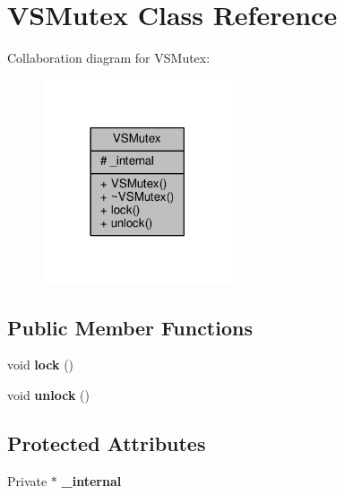 \hypertarget{classVSMutex}{}\section{V\+S\+Mutex Class Reference}
\label{classVSMutex}


Collaboration diagram for V\+S\+Mutex\+:
\nopagebreak
\begin{figure}[H]
\begin{center}
\leavevmode
\includegraphics[width=158pt]{d0/d17/classVSMutex__coll__graph}
\end{center}
\end{figure}
\subsection*{Public Member Functions}
\begin{DoxyCompactItemize}
\item 
void {\bfseries lock} ()\hypertarget{classVSMutex_ab49520c89fcdb8cbf1d3662255e1a16d}{}\label{classVSMutex_ab49520c89fcdb8cbf1d3662255e1a16d}

\item 
void {\bfseries unlock} ()\hypertarget{classVSMutex_a4f18e37e226ef797f6d9c47c1cc690f5}{}\label{classVSMutex_a4f18e37e226ef797f6d9c47c1cc690f5}

\end{DoxyCompactItemize}
\subsection*{Protected Attributes}
\begin{DoxyCompactItemize}
\item 
Private $\ast$ {\bfseries \+\_\+internal}\hypertarget{classVSMutex_a768ce2cfb841abb171a2cc0692612d40}{}\label{classVSMutex_a768ce2cfb841abb171a2cc0692612d40}

\end{DoxyCompactItemize}
